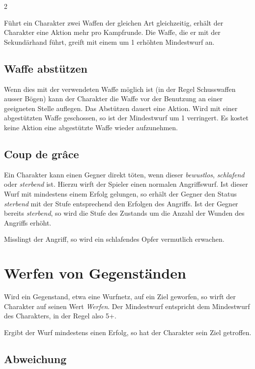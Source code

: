 \begin{multicols}{2}
\begin{pexample}[Beispiel]
Führt ein Charakter zwei Waffen der gleichen Art gleichzeitig, erhält der Charakter eine Aktion mehr pro Kampfrunde. Die Waffe, die er mit der Sekundärhand führt, greift mit einem um 1 erhöhten Mindestwurf an.

\subsection{Waffe abstützen}

Wenn dies mit der verwendeten Waffe möglich ist (in der Regel Schusswaffen ausser Bögen) kann der Charakter die Waffe vor der Benutzung an einer geeigneten Stelle auflegen. Das Abstützen dauert eine Aktion. Wird mit einer abgestützten Waffe geschossen, so ist der Mindestwurf um 1 verringert. Es kostet keine Aktion eine abgestützte Waffe wieder aufzunehmen.

\subsection{Coup de grâce}

Ein Charakter kann einen Gegner direkt töten, wenn dieser \textit{bewustlos}, \textit{schlafend} oder \textit{sterbend} ist. Hierzu wirft der Spieler einen normalen Angriffswurf. Ist dieser Wurf mit mindestens einem Erfolg gelungen, so erhält der Gegner den Status \textit{sterbend} mit der Stufe entsprechend den Erfolgen des Angriffs. Ist der Gegner bereits \textit{sterbend}, so wird die Stufe des Zustands um die Anzahl der Wunden des Angriffs erhöht.

Misslingt der Angriff, so wird ein schlafendes Opfer vermutlich erwachen.

\section{Werfen von Gegenständen}
\label{sec:throwing}

Wird ein Gegenstand, etwa eine Wurfnetz, auf ein Ziel geworfen, so wirft der Charakter auf seinen Wert \textit{Werfen}. Der Mindestwurf entspricht dem Mindestwurf des Charakters, in der Regel also 5+.

Ergibt der Wurf mindestens einen Erfolg, so hat der Charakter sein Ziel getroffen.

\subsection{Abweichung}


\end{pexample}
\end{multicols}
